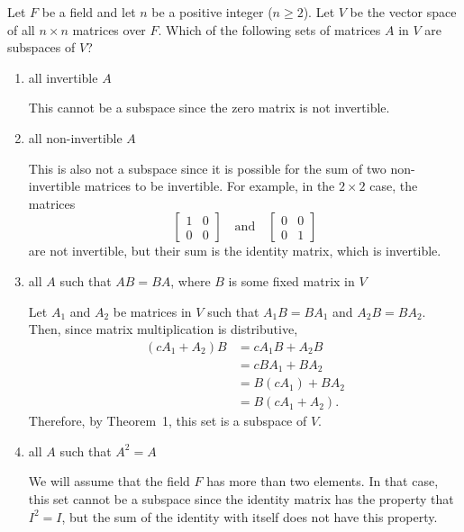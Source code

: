  Let $F$ be a field and let $n$ be a positive integer
($n\geq2$). Let $V$ be the vector space of all $n\times n$ matrices
over $F$. Which of the following sets of matrices $A$ in $V$ are
subspaces of $V$?
\begin{enumerate}
\item all invertible $A$
  \begin{solution}
    This cannot be a subspace since the zero matrix is not invertible.
  \end{solution}
\item all non-invertible $A$
  \begin{solution}
    This is also not a subspace since it is possible for the sum of
    two non-invertible matrices to be invertible. For example, in the
    $2\times2$ case, the matrices
    \begin{equation*}
      \begin{bmatrix}
        1 & 0 \\
        0 & 0
      \end{bmatrix}
      \quad\text{and}\quad
      \begin{bmatrix}
        0 & 0 \\
        0 & 1
      \end{bmatrix}
    \end{equation*}
    are not invertible, but their sum is the identity matrix, which is
    invertible.
  \end{solution}
\item all $A$ such that $AB = BA$, where $B$ is some fixed matrix in
  $V$
  \begin{solution}
    Let $A_1$ and $A_2$ be matrices in $V$ such that $A_1B = BA_1$ and
    $A_2B = BA_2$. Then, since matrix multiplication is distributive,
    \begin{align*}
      (cA_1 + A_2)B &= cA_1B + A_2B \\
                    &= cBA_1 + BA_2 \\
                    &= B(cA_1) + BA_2 \\
                    &= B(cA_1 + A_2).
    \end{align*}
    Therefore, by Theorem~1, this set is a subspace of $V$.
  \end{solution}
\item all $A$ such that $A^2 = A$
  \begin{solution}
    We will assume that the field $F$ has more than two elements. In
    that case, this set cannot be a subspace since the identity matrix
    has the property that $I^2 = I$, but the sum of the identity with
    itself does not have this property.
  \end{solution}
\end{enumerate}
